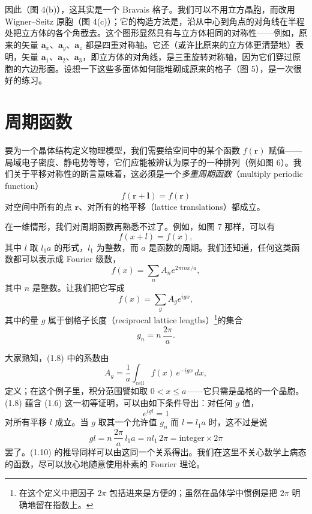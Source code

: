 因此（图 4(b)），这其实是一个 Bravais 格子。我们可以不用立方晶胞，而改用 Wigner–Seitz 原胞（图 4(c)）；它的构造方法是，沿从中心到角点的对角线在半程处把立方体的各个角截去。这个图形显然具有与立方体相同的对称性——例如，原来的矢量 $\mathbf{a}_x$、$\mathbf{a}_y$、$\mathbf{a}_z$ 都是四重对称轴。它还（或许比原来的立方体更清楚地）表明，矢量 $\mathbf{a}_1$、$\mathbf{a}_2$、$\mathbf{a}_3$，即立方体的对角线，是三重旋转对称轴，因为它们穿过原胞的六边形面。设想一下这些多面体如何能堆砌成原来的格子（图 5），是一次很好的练习。

\section{周期函数}

要为一个晶体结构定义物理模型，我们需要给空间中的某个函数 $f(\mathbf{r})$ 赋值——局域电子密度、静电势等等，它们应能被辨认为原子的一种排列（例如图 6）。我们关于平移对称性的断言意味着，这必须是一个\emph{多重周期函数}（multiply periodic function）
\begin{equation*}
f(\mathbf{r}+\boldsymbol{l}) = f(\mathbf{r})
\tag{1.5}
\end{equation*}
对空间中所有的点 $\mathbf{r}$、对所有的格平移（lattice translations）都成立。



在一维情形，我们对周期函数再熟悉不过了。例如，如图 7 那样，可以有
\begin{equation*}
f(x+l) = f(x),
\tag{1.6}
\end{equation*}
其中 $l$ 取 $l_1 a$ 的形式，$l_1$ 为整数，而 $a$ 是函数的周期。我们还知道，任何这类函数都可以表示成 Fourier 级数，
\begin{equation*}
f(x) = \sum_n A_n e^{2\pi i n x/a},
\tag{1.7}
\end{equation*}
其中 $n$ 是整数。让我们把它写成
\begin{equation*}
f(x) = \sum_g A_g e^{igx},
\tag{1.8}
\end{equation*}
其中的量 $g$ 属于倒格子长度（reciprocal lattice lengths）\footnote{在这个定义中把因子 $2\pi$ 包括进来是方便的；虽然在晶体学中惯例是把 $2\pi$ 明确地留在指数上。}的集合
\begin{equation*}
g_n = n\,\frac{2\pi}{a}.
\tag{1.9}
\end{equation*}

大家熟知，(1.8) 中的系数由
\begin{equation*}
A_g = \frac{1}{a}\int_{\text{cell}} f(x)\, e^{-igx}\, dx,
\tag{1.10}
\end{equation*}
定义；在这个例子里，积分范围譬如取 $0 < x \leqslant a$——它只需是晶格的一个晶胞。(1.8) 蕴含 (1.6) 这一初等证明，可以由如下条件导出：对任何 $g$ 值，
\begin{equation*}
e^{igl} = 1
\tag{1.11}
\end{equation*}
对所有平移 $l$ 成立。当 $g$ 取其一个允许值 $g_n$ 而 $l = l_1 a$ 时，这不过是说
\begin{equation*}
gl = n\,\frac{2\pi}{a}\, l_1 a = n l_1\, 2\pi = \text{integer} \times 2\pi
\tag{1.12}
\end{equation*}
罢了。(1.10) 的推导同样可以由这同一个关系得出。我们在这里不关心数学上病态的函数，尽可以放心地随意使用朴素的 Fourier 理论。


